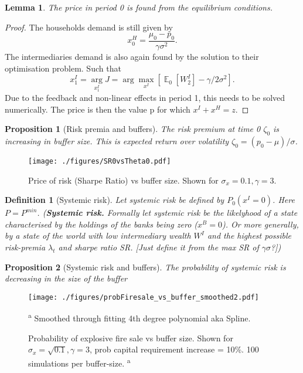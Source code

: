 \documentclass[11pt]{article}
\DeclareMathOperator{\E}{\mathbb{E}} %
\newtheorem{proposition}{Proposition}
\newtheorem{lemma}{Lemma}%
\newtheorem{definition}{Definition}%
\begin{document}
\begin{appendices}
\begin{lemma}
The price in period 0 is found from the equilibrium conditions.
\end{lemma}
\begin{proof}
The households demand is still given by
\begin{equation}
x^H_0 = \frac{\mu_0-p_0}{\gamma \sigma^2}.
\end{equation}
The intermediaries demand is also again found by the solution to their optimisation problem. Such that
\begin{equation}
x^{I}_1 = \underset{x^{I}_1}{\arg} J = \arg \max_{x^I}\left[\E_0[W^I_2] - \gamma/2\sigma^2\right].
\end{equation}
Due to the feedback and non-linear effects in period 1, this needs to be solved numerically. 
The price is then the value p for which $x^I+x^H = z$.
\end{proof}


\begin{proposition}[Risk premia and buffers]
The risk premium at time 0 $\zeta_0$ is increasing in buffer size.
This is expected return over volatility $\zeta_0 = (p_0 - \mu)/ \sigma$.
\end{proposition}

\begin{figure}[h]
\centering
\texttt{[image: ./figures/SR0vsTheta0.pdf]}
\caption{Price of risk (Sharpe Ratio) vs buffer size. Shown for $\sigma_x = 0.1, \gamma = 3$. }
\label{f_probSRvsBuffer3}
\end{figure}


\begin{definition}[Systemic risk]
Let systemic risk be defined by $P_0 (x^I=0)$. Here $P = P^{min}$.
(\textbf{Systemic risk.} Formally let systemic risk be the likelyhood of a state characterised by the holdings of the banks being zero ($x^B = 0$). Or more generally, by a state of the world with low intermediary wealth $W^I$ and the highest possible risk-premia $\lambda_t$ and sharpe ratio SR. [Just define it from the max SR of $\gamma\sigma$?])
\end{definition}


\begin{proposition}[Systemic risk and buffers]
The probability of systemic risk is decreasing in the size of the buffer
\end{proposition}


\begin{figure}[h]
\centering
\texttt{[image: ./figures/probFiresale\_vs\_buffer\_smoothed2.pdf]}
\caption{Probability of explosive fire sale vs buffer size. Shown for $\sigma_x = \sqrt{0.1}, \gamma = 3$, prob capital requirement increase = 10\%. 100 simulations per buffer-size.\textsuperscript{\color{blue} a}}
{\small\textsuperscript{{\color{blue} a}} Smoothed through fitting 4th degree polynomial aka Spline.}
\label{f_probFSvsBuffer3}
\end{figure}
\fi


\end{appendices}
\end{document}
